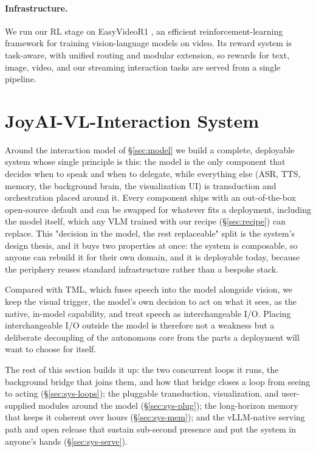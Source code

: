 \documentclass{llmxive}
\begin{document}
\paragraph{\textbf{Infrastructure.}}
We run our RL stage on EasyVideoR1 \cite{qin2026easyvideor1easierrlvideo}, an efficient reinforcement-learning framework for training vision-language models on video. Its reward system is task-aware, with unified routing and modular extension, so rewards for text, image, video, and our streaming interaction tasks are served from a single pipeline. 





\section{JoyAI-VL-Interaction System}\label{sec:system}
Around the interaction model of §\ref{sec:model} we build a complete, deployable system whose single principle is this: the model is the only component that decides when to speak and when to delegate, while everything else (ASR, TTS, memory, the background brain, the visualization UI) is transduction and orchestration placed around it. Every component ships with an out-of-the-box open-source default and can be swapped for whatever fits a deployment, including the model itself, which any VLM trained with our recipe (§\ref{sec:recipe}) can replace. This "decision in the model, the rest replaceable" split is the system's design thesis, and it buys two properties at once: the system is composable, so anyone can rebuild it for their own domain, and it is deployable today, because the periphery reuses standard infrastructure rather than a bespoke stack.

Compared with TML, which fuses speech into the model alongside vision, we keep the visual trigger, the model's own decision to act on what it sees, as the native, in-model capability, and treat speech as interchangeable I/O. Placing interchangeable I/O outside the model is therefore not a weakness but a deliberate decoupling of the autonomous core from the parts a deployment will want to choose for itself.


The rest of this section builds it up: the two concurrent loops it runs, the background bridge that joins them, and how that bridge closes a loop from seeing to acting (§\ref{sec:sys-loops}); the pluggable transduction, visualization, and user-supplied modules around the model (§\ref{sec:sys-plug}); the long-horizon memory that keeps it coherent over hours (§\ref{sec:sys-mem}); and the vLLM-native serving path and open release that sustain sub-second presence and put the system in anyone's hands (§\ref{sec:sys-serve}).
\end{document}
